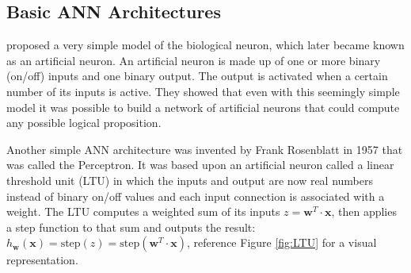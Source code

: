 \documentclass[\main/thesis.tex]{subfiles}
\begin{document}
\subsection{Basic ANN Architectures}
\textcite{McCulloch} proposed a very simple model of the biological neuron, which later became known as an artificial neuron. An artificial neuron is made up of one or more binary (on/off) inputs and one binary output. The output is activated when a 
certain number of its inputs is active. They showed that even with this seemingly simple model it was possible to build a network of artificial neurons that could compute any possible logical proposition.

Another simple ANN architecture was invented by Frank Rosenblatt in 1957 that was called the Perceptron. It was based upon an artificial neuron called a linear threshold unit (LTU) in which the inputs and output are now real numbers instead of binary on/off values and each input connection is associated with a weight. The LTU computes a weighted sum of its inputs $z {=} \boldsymbol{w}^T {\cdot} \boldsymbol{x}$, then applies a step function to that sum and outputs the result: 
$h_{\boldsymbol{w}}(\boldsymbol{x}) {=} \text{step}(z) {=} \text{step}(\boldsymbol{w}^T {\cdot} \boldsymbol{x})$, reference Figure \ref{fig:LTU} for a visual representation.
\end{document}
